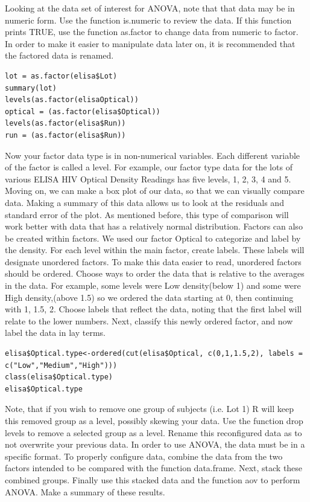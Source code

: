 Looking at the data set of interest for ANOVA, note that that data may be in numeric form. Use the function is.numeric to review the data. If this function prints TRUE, use the function as.factor to change data from numeric to factor. In order to make it easier to manipulate data later on, it is recommended that the factored data is renamed. 
\begin{lstlisting}
lot = as.factor(elisa$Lot)
summary(lot)
levels(as.factor(elisaOptical))
optical = (as.factor(elisa$Optical))
levels(as.factor(elisa$Run))
run = (as.factor(elisa$Run))
\end{lstlisting}
Now your factor data type is in non-numerical variables.
Each different variable of the factor is called a level.
For example, our factor type data for the lots of various ELISA HIV Optical Density Readings has five levels, 1, 2, 3, 4 and 5.
Moving on, we can make a box plot of our data, so that we can visually compare data.
Making a summary of this data allows us to look at the residuals and standard error of the plot.
As mentioned before, this type of comparison will work better with data that has a relatively normal distribution. 
Factors can also be created within factors.
We used our factor Optical to categorize and label by the density.
For each level within the main factor, create labels.
These labels will designate unordered factors.
To make this data easier to read, unordered factors should be ordered.
Choose ways to order the data that is relative to the averages in the data.
For example, some levels were Low density(below 1) and some were High density,(above 1.5) so we ordered the data starting at 0, then continuing with 1, 1.5, 2.
Choose labels that reflect the data, noting that the first label will relate to the lower numbers.
Next, classify this newly ordered factor, and now label the data in lay terms. 
\begin{lstlisting}
elisa$Optical.type<-ordered(cut(elisa$Optical, c(0,1,1.5,2), labels = c("Low","Medium","High")))
class(elisa$Optical.type)
elisa$Optical.type
\end{lstlisting}
Note, that if you wish to remove one group of subjects (i.e. Lot 1) R will keep this removed group as a level, possibly skewing your data. Use the function drop levels to remove a selected group as a level. Rename this reconfigured data as to not overwrite your previous data. 
In order to use ANOVA, the data must be in a specific format. To properly configure data, combine the data from the two factors intended to be compared with the function data.frame. Next, stack these combined groups. Finally use this stacked data and the function aov to perform ANOVA. Make a summary of these results.

